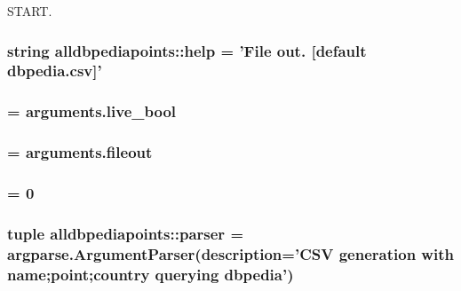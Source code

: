 \-S\-T\-A\-R\-T. 

\hypertarget{namespacealldbpediapoints_ab3aabe434bef7bdc96533eb4b05d5eae}{
\subsubsection[{help}]{\setlength{\rightskip}{0pt plus 5cm}string {\bf alldbpediapoints\-::help} = '\-File out. \mbox{[}default dbpedia.\-csv\mbox{]}'}}\label{namespacealldbpediapoints_ab3aabe434bef7bdc96533eb4b05d5eae}
\hypertarget{namespacealldbpediapoints_a4222234d924a677b768a452ce5dea7e1}{
\subsubsection[{islive}]{ = arguments.\-live\-\_\-bool}}\label{namespacealldbpediapoints_a4222234d924a677b768a452ce5dea7e1}
\hypertarget{namespacealldbpediapoints_ab8a03fffea8583884638a93339ff4523}{
\subsubsection[{\-O\-F}]{ = arguments.\-fileout}}\label{namespacealldbpediapoints_ab8a03fffea8583884638a93339ff4523}
\hypertarget{namespacealldbpediapoints_ab7c98613bae9215521f07b8219c81bcc}{
\subsubsection[{offset}]{ = 0}}\label{namespacealldbpediapoints_ab7c98613bae9215521f07b8219c81bcc}
\hypertarget{namespacealldbpediapoints_adf8df4e9e7647db7138cbc856f138d08}{
\subsubsection[{parser}]{\setlength{\rightskip}{0pt plus 5cm}tuple {\bf alldbpediapoints\-::parser} = argparse.\-Argument\-Parser(description='\-C\-S\-V generation with name;point;country querying dbpedia')}}\label{namespacealldbpediapoints_adf8df4e9e7647db7138cbc856f138d08}


